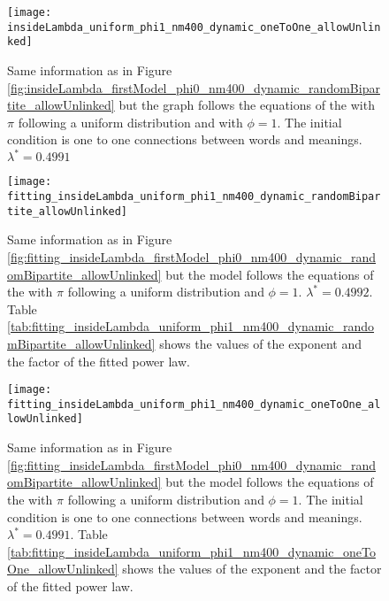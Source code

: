 \begin{figure}
  \centering
  \texttt{[image: insideLambda\_uniform\_phi1\_nm400\_dynamic\_oneToOne\_allowUnlinked]}
  \caption{Same information as in Figure \ref{fig:insideLambda_firstModel_phi0_nm400_dynamic_randomBipartite_allowUnlinked} but the graph follows the equations of the \secondmodel{} with $\pi$ following a uniform distribution and with $\phi=1$. The initial condition is one to one connections between words and meanings. $\lambda^* = 0.4991$}
  \label{fig:insideLambda_uniform_phi1_nm400_dynamic_oneToOne_allowUnlinked}
\end{figure}

\begin{figure}
  \centering
  \texttt{[image: fitting\_insideLambda\_uniform\_phi1\_nm400\_dynamic\_randomBipartite\_allowUnlinked]}
  \caption{Same information as in Figure \ref{fig:fitting_insideLambda_firstModel_phi0_nm400_dynamic_randomBipartite_allowUnlinked} but the model follows the equations of the \secondmodel{} with $\pi$ following a uniform distribution and $\phi=1$. $\lambda^*=0.4992$.
Table \ref{tab:fitting_insideLambda_uniform_phi1_nm400_dynamic_randomBipartite_allowUnlinked} shows the values of the exponent and the factor of the fitted power law.}
  \label{fig:fitting_insideLambda_uniform_phi1_nm400_dynamic_randomBipartite_allowUnlinked}
\end{figure}

\begin{figure}
  \centering
  \texttt{[image: fitting\_insideLambda\_uniform\_phi1\_nm400\_dynamic\_oneToOne\_allowUnlinked]}
  \caption{Same information as in Figure \ref{fig:fitting_insideLambda_firstModel_phi0_nm400_dynamic_randomBipartite_allowUnlinked} but the model follows the equations of the \secondmodel{} with $\pi$ following a uniform distribution and $\phi=1$. The initial condition is one to one connections between words and meanings. $\lambda^*=0.4991$.
Table \ref{tab:fitting_insideLambda_uniform_phi1_nm400_dynamic_oneToOne_allowUnlinked} shows the values of the exponent and the factor of the fitted power law.}
  \label{fig:fitting_insideLambda_uniform_phi1_nm400_dynamic_oneToOne_allowUnlinked}
\end{figure}





